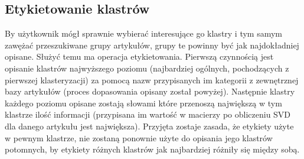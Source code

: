 \subsection{Etykietowanie klastrów}
By użytkownik mógł sprawnie wybierać interesujące go klastry i tym samym zawężać przeszukiwane grupy artykułów, grupy te powinny być jak najdokładniej opisane. Służyć temu ma operacja etykietowania. Pierwszą czynnością jest opisanie klastrów najwyższego poziomu (najbardziej ogólnych, pochodzących z pierwszej klasteryzacji) za pomocą nazw przypisanych im kategorii z zewnętrznej bazy artykułów (proces dopasowania opisany został powyżej).
Następnie klastry każdego poziomu opisane zostają słowami które przenoszą największą w tym klastrze ilość informacji (przypisana im wartość w macierzy po obliczeniu SVD dla danego artykułu jest największa). Przyjęta zostaje zasada, że etykiety użyte w pewnym klastrze, nie zostaną ponownie użyte do opisania jego klastrów potomnych, by etykiety różnych klastrów jak najbardziej różniły się między sobą.
